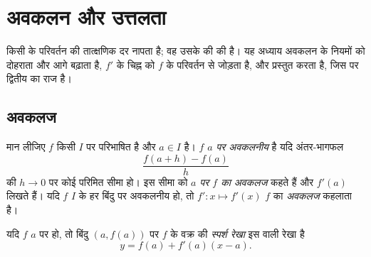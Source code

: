 \chapter{अवकलन और उत्तलता}\label{ch:g12:deriv}

 किसी  के परिवर्तन की तात्क्षणिक दर नापता है; वह उसके  की  की  है। यह अध्याय अवकलन के नियमों को दोहराता और आगे बढ़ाता है,
$f'$ के चिह्न को $f$ के परिवर्तन से जोड़ता है, और  प्रस्तुत करता है,
जिस पर द्वितीय  का राज है।

\section{अवकलज}

\begin{definition}[किसी बिंदु पर अवकलज]\label{def:g12:deriv:derivative}
मान लीजिए $f$ किसी  $I$ पर परिभाषित है और $a \in I$ है।  $f$ \emph{$a$
पर अवकलनीय} है यदि अंतर-भागफल
\[
\frac{f(a+h) - f(a)}{h}
\]
की $h \to 0$ पर कोई परिमित सीमा हो। इस सीमा को \emph{$a$ पर $f$ का अवकलज} कहते
हैं और $f'(a)$ लिखते हैं। यदि $f$ $I$ के हर बिंदु पर अवकलनीय हो, तो  $f' \colon x \mapsto f'(x)$
$f$ का \emph{अवकलज} कहलाता है।
\end{definition}

\begin{definition}[स्पर्श रेखा]\label{def:g12:deriv:tangent}
यदि $f$ $a$ पर  हो, तो बिंदु $(a, f(a))$ पर $f$ के वक्र की \emph{स्पर्श
रेखा} इस  वाली रेखा है
\[
y = f(a) + f'(a)(x - a).
\]
\end{definition}


